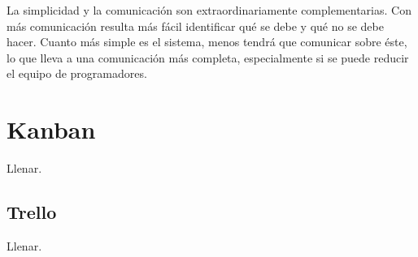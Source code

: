 La simplicidad y la comunicación son extraordinariamente complementarias. Con más comunicación resulta más fácil identificar qué se debe y qué no se debe hacer. Cuanto más simple es el sistema, menos tendrá que comunicar sobre éste, lo que lleva a una comunicación más completa, especialmente si se puede reducir el equipo de programadores.

\section{Kanban}
Llenar.

\subsection{Trello}
Llenar.